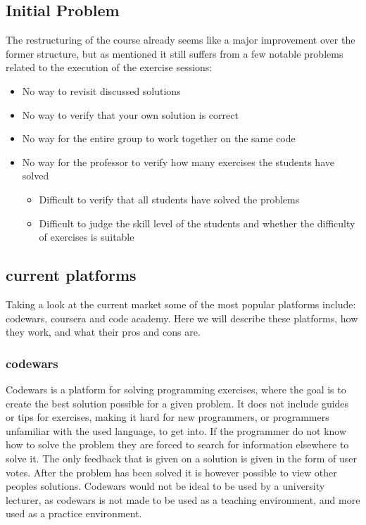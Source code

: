 \subsection{Initial Problem} \label{sec:initial-problem}
The restructuring of the course already seems like a major improvement over the former structure, but as mentioned it still suffers from a few notable problems related to the execution of the exercise sessions:
\begin{itemize}
	\item No way to revisit discussed solutions
	\item No way to verify that your own solution is correct
	\item No way for the entire group to work together on the same code
	\item No way for the professor to verify how many exercises the students have solved
	\begin{itemize}
		\item Difficult to verify that all students have solved the problems
		\item Difficult to judge the skill level of the students and whether the difficulty of exercises is suitable
	\end{itemize}
\end{itemize}

\subsection{current platforms}
Taking a look at the current market some of the most popular platforms include: codewars, coursera and code academy.
Here we will describe these platforms, how they work, and what their pros and cons are.

\subsubsection*{codewars}
Codewars is a platform for solving programming exercises, where the goal is to create the best solution possible for a given problem. It does not include guides or tips for exercises, making it hard for new programmers, or programmers unfamiliar with the used language, to get into. If the programmer do not know how to solve the problem they are forced to search for information elsewhere to solve it. The only feedback that is given on a solution is given in the form of user votes. After the problem has been solved it is however possible to view other peoples solutions. 
Codewars would not be ideal to be used by a university lecturer, as codewars is not made to be used as a teaching environment, and more used as a practice environment.

